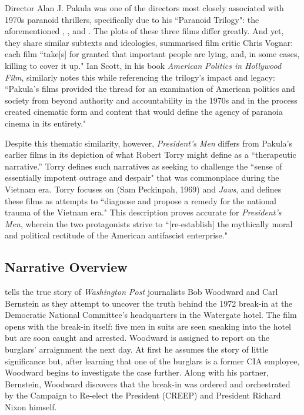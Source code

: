 Director Alan J. Pakula was one of the directors most closely associated with 1970s paranoid thrillers, specifically due to his ``Paranoid Trilogy": the aforementioned , , and .
The plots of these three films differ greatly.
And yet, they share similar subtexts and ideologies, summarised film critic Chris Vognar: each film ``take[s] for granted that important people are lying, and, in some cases, killing to cover it up."\autocites[][]{vognar_parallax_2021}
Ian Scott, in his book \textit{American Politics in Hollywood Film}, similarly notes this while referencing the trilogy's impact and legacy:
``Pakula's films provided the thread for an examination of American politics and society from beyond authority and accountability in the 1970s and in the process created cinematic form and content that would define the agency of paranoia cinema in its entirety."\autocites[][138]{scott_american_2011}

Despite this thematic similarity, however, \textit{President's Men} differs from Pakula's earlier films in its depiction of what Robert Torry might define as a ``therapeutic narrative.”
Torry defines such narratives as seeking to challenge the ``sense of essentially impotent outrage and despair" that was commonplace during the Vietnam era.\autocites[][27]{torry_therapeutic_1993}
Torry focuses on  (Sam Peckinpah, 1969) and \textit{Jaws}, and defines these films as attempts to ``diagnose and propose a remedy for the national trauma of the Vietnam era."\autocites[][27]{torry_therapeutic_1993}
This description proves accurate for \textit{President's Men}, wherein the two protagonists strive to ``[re-establish] the mythically moral and political rectitude of the American antifascist enterprise."\autocites[][34]{torry_therapeutic_1993}




\subsection{Narrative Overview}

 tells the true story of \textit{Washington Post} journalists Bob Woodward and Carl Bernstein as they attempt to uncover the truth behind the 1972 break-in at the Democratic National Committee's headquarters in the Watergate hotel.
The film opens with the break-in itself: five men in suits are seen sneaking into the hotel but are soon caught and arrested.
Woodward is assigned to report on the burglars' arraignment the next day.
At first he assumes the story of little significance but, after learning that one of the burglars is a former CIA employee, Woodward begins to investigate the case further.
Along with his partner, Bernstein, Woodward discovers that the break-in was ordered and orchestrated by the Campaign to Re-elect the President (CREEP) and President Richard Nixon himself.

